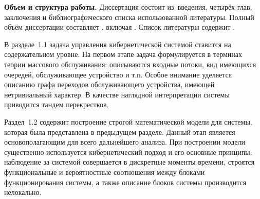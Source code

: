







\textbf{Объем и структура работы.} Диссертация состоит из~введения, четырёх глав, заключения и библиографического списка использованной литературы. 
%
Полный объём диссертации составляет
, включая
. %
 Список литературы содержит  
.

В разделе~1.1 задача управления кибернетической системой ставится на содержательном уровне. На первом этапе задача формулируется в терминах теории массового обслуживания: описываются входные потоки, вид имеющихся очередей, обслуживающее устройство и т.п. Особое внимание уделяется описанию графа переходов обслуживающего устройства, имеющей нетривиальный характер. В качестве наглядной интерпретации системы приводится тандем перекрестков. 

Раздел~1.2 содержит построение строгой математической модели для системы, которая была представлена в предыдущем разделе. Данный этап является основополагающим для всего дальнейшего анализа.  При построении модели существенно используется кибернетический подход и его основные принципы: наблюдение за системой совершается в дискретные моменты времени,  строятся функциональные и вероятностные соотношения между блоками функционирования системы, а также описание блоков системы производится нелокально.

